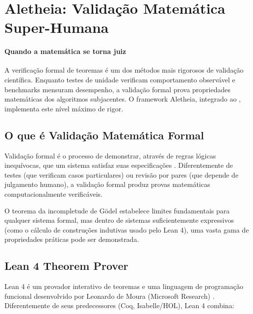 \section{Aletheia: Validação Matemática Super-Humana}
\label{sec:aletheia}
\nivelphd

\paragraph{Quando a matemática se torna juiz} A verificação formal de teoremas é um dos métodos mais rigorosos
de validação científica. Enquanto testes de unidade verificam
comportamento observável e benchmarks mensuram desempenho, a
validação formal prova propriedades matemáticas dos algoritmos
subjacentes. O framework Aletheia, integrado ao \opencodeeco{},
implementa este nível máximo de rigor.

\subsection{O que é Validação Matemática Formal}

Validação formal é o processo de demonstrar, através de regras
lógicas inequívocas, que um sistema satisfaz suas especificações
\cite{avigad2020lean, bertot2004interactive}. Diferentemente de
testes (que verificam casos particulares) ou revisão por pares
(que depende de julgamento humano), a validação formal produz
provas matemáticas computacionalmente verificáveis.

O teorema da incompletude de Gödel \cite{goedel1931formal} estabelece
limites fundamentais para qualquer sistema formal, mas dentro de
sistemas suficientemente expressivos (como o cálculo de construções
indutivas usado pelo Lean 4), uma vasta gama de propriedades
práticas pode ser demonstrada.

\subsection{Lean 4 Theorem Prover}

Lean 4 é um provador interativo de teoremas e uma linguagem de
programação funcional desenvolvido por Leonardo de Moura (Microsoft
Research) \cite{deMoura2015lean, avigad2020lean}. Diferentemente de
seus predecessores (Coq, Isabelle/HOL), Lean 4 combina:

